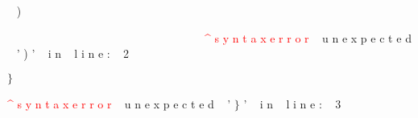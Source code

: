 \documentclass[8, usernames, dvipsnames]{beamer}
\begin{document}
\begin{frame}
\textcolor{White}{\ }
\textcolor{PineGreen}{)}

\textcolor{White}{\ }
\textcolor{White}{\ }
\textcolor{White}{\ }
\textcolor{White}{\ }
\textcolor{White}{\ }
\textcolor{White}{\ }
\textcolor{White}{\ }
\textcolor{White}{\ }
\textcolor{White}{\ }
\textcolor{White}{\ }
\textcolor{White}{\ }
\textcolor{White}{\ }
\textcolor{White}{\ }
\textcolor{White}{\ }
\textcolor{White}{\ }
\textcolor{White}{\ }
\textcolor{White}{\ }
\textcolor{White}{\ }
\textcolor{White}{\ }
\textcolor{White}{\ }
\textcolor{White}{\ }
\textcolor{Red}{\textasciicircum}
\textcolor{Red}{
}
\textcolor{Red}{s}
\textcolor{Red}{y}
\textcolor{Red}{n}
\textcolor{Red}{t}
\textcolor{Red}{a}
\textcolor{Red}{x}
\textcolor{Red}{ }
\textcolor{Red}{e}
\textcolor{Red}{r}
\textcolor{Red}{r}
\textcolor{Red}{o}
\textcolor{Red}{r}
\textcolor{White}{\ }
\textcolor{PineGreen}{u}
\textcolor{PineGreen}{n}
\textcolor{PineGreen}{e}
\textcolor{PineGreen}{x}
\textcolor{PineGreen}{p}
\textcolor{PineGreen}{e}
\textcolor{PineGreen}{c}
\textcolor{PineGreen}{t}
\textcolor{PineGreen}{e}
\textcolor{PineGreen}{d}
\textcolor{White}{\ }
\textcolor{PineGreen}{'}
\textcolor{PineGreen}{)}
\textcolor{PineGreen}{'}
\textcolor{White}{\ }
\textcolor{PineGreen}{i}
\textcolor{PineGreen}{n}
\textcolor{White}{\ }
\textcolor{PineGreen}{l}
\textcolor{PineGreen}{i}
\textcolor{PineGreen}{n}
\textcolor{PineGreen}{e}
\textcolor{PineGreen}{:}
\textcolor{White}{\ }
\textcolor{PineGreen}{2}


\textcolor{PineGreen}{$\}$}

\textcolor{Red}{\textasciicircum}
\textcolor{Red}{
}
\textcolor{Red}{s}
\textcolor{Red}{y}
\textcolor{Red}{n}
\textcolor{Red}{t}
\textcolor{Red}{a}
\textcolor{Red}{x}
\textcolor{Red}{ }
\textcolor{Red}{e}
\textcolor{Red}{r}
\textcolor{Red}{r}
\textcolor{Red}{o}
\textcolor{Red}{r}
\textcolor{White}{\ }
\textcolor{PineGreen}{u}
\textcolor{PineGreen}{n}
\textcolor{PineGreen}{e}
\textcolor{PineGreen}{x}
\textcolor{PineGreen}{p}
\textcolor{PineGreen}{e}
\textcolor{PineGreen}{c}
\textcolor{PineGreen}{t}
\textcolor{PineGreen}{e}
\textcolor{PineGreen}{d}
\textcolor{White}{\ }
\textcolor{PineGreen}{'}
\textcolor{PineGreen}{$\}$}
\textcolor{PineGreen}{'}
\textcolor{White}{\ }
\textcolor{PineGreen}{i}
\textcolor{PineGreen}{n}
\textcolor{White}{\ }
\textcolor{PineGreen}{l}
\textcolor{PineGreen}{i}
\textcolor{PineGreen}{n}
\textcolor{PineGreen}{e}
\textcolor{PineGreen}{:}
\textcolor{White}{\ }
\textcolor{PineGreen}{3}


\end{frame} 
\end{document}
